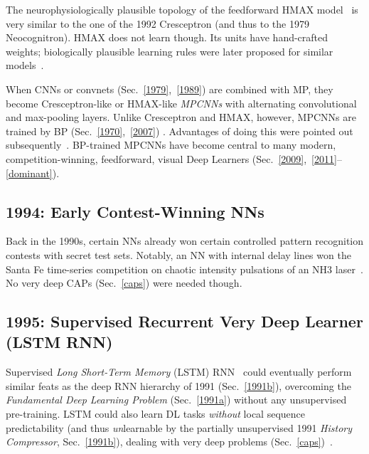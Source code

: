 \documentclass[letterpaper]{article}
\begin{document}
\begin{CJK*}{UTF8}{gbsn}
\begin{sloppypar}
The neurophysiologically plausible topology of the feedforward HMAX model~\citep{riesenhuber:1999} 
is very similar to the one of the 1992 Cresceptron (and thus to the 1979 Neocognitron).
HMAX does not learn though. Its units have hand-crafted weights; 
biologically plausible learning rules were later proposed for
similar models~\citep[e.g.,][]{serre2002,teichmann2012}.


When CNNs or convnets (Sec.~\ref{1979},~\ref{1989}) 
are combined with MP, they become Cresceptron-like or HMAX-like {\em MPCNNs} with
alternating convolutional and max-pooling layers. 
Unlike Cresceptron and HMAX, however, MPCNNs are trained by 
BP (Sec.~\ref{1970},~\ref{2007}) \citep{ranzato-cvpr-07}.
Advantages of doing this
were pointed out subsequently~\citep{scherer:2010}.
BP-trained MPCNNs 
have become
central to many modern, competition-winning, feedforward, visual Deep Learners (Sec.~\ref{2009},~\ref{2011}--\ref{dominant}). 



\subsection{1994: Early Contest-Winning NNs}
\label{1994}

Back in the 1990s, certain NNs already won certain 
controlled pattern recognition contests 
with secret test sets. Notably, 
an NN with internal delay lines 
 won the Santa Fe time-series competition on chaotic intensity 
pulsations of an NH3 laser~\citep{wan1994,weigend1993}.
No very deep CAPs (Sec.~\ref{caps}) were needed though. 


\subsection{1995: Supervised Recurrent Very Deep Learner (LSTM RNN)}
\label{1997}

Supervised {\em Long Short-Term Memory} (LSTM) RNN~\citep{lstm97and95,Gers:2000nc,Perez:02} 
could eventually perform similar feats as  the deep RNN hierarchy of 1991
(Sec.~\ref{1991b}),
overcoming the {\em Fundamental Deep Learning Problem} (Sec.~\ref{1991a}) without any unsupervised pre-training.
LSTM could also learn DL tasks {\em without} local sequence predictability (and thus 
{\em un}learnable by the partially 
unsupervised 1991 {\em History Compressor}, Sec.~\ref{1991b}), dealing with  
very deep problems (Sec.~\ref{caps})~\citep[e.g.,][]{Gers:02jmlr}.


\end{sloppypar}
\end{CJK*}
\end{document}
